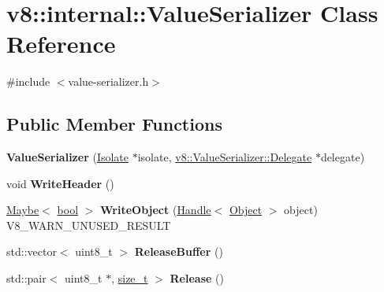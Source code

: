 \hypertarget{classv8_1_1internal_1_1ValueSerializer}{}\section{v8\+:\+:internal\+:\+:Value\+Serializer Class Reference}
\label{classv8_1_1internal_1_1ValueSerializer}


{\ttfamily \#include $<$value-\/serializer.\+h$>$}

\subsection*{Public Member Functions}
\begin{DoxyCompactItemize}
\item 
\mbox{\label{classv8_1_1internal_1_1ValueSerializer_a649f863d72c6bd8073cc7b3f9ec5e933}} 
{\bfseries Value\+Serializer} (\mbox{\hyperlink{classv8_1_1internal_1_1Isolate}{Isolate}} $\ast$isolate, \mbox{\hyperlink{classv8_1_1ValueSerializer_1_1Delegate}{v8\+::\+Value\+Serializer\+::\+Delegate}} $\ast$delegate)
\item 
\mbox{\label{classv8_1_1internal_1_1ValueSerializer_a614243f57ac8fadba4e98e546855e751}} 
void {\bfseries Write\+Header} ()
\item 
\mbox{\label{classv8_1_1internal_1_1ValueSerializer_ad038118e91c409ddb7e76c03247b33d9}} 
\mbox{\hyperlink{classv8_1_1Maybe}{Maybe}}$<$ \mbox{\hyperlink{classbool}{bool}} $>$ {\bfseries Write\+Object} (\mbox{\hyperlink{classv8_1_1internal_1_1Handle}{Handle}}$<$ \mbox{\hyperlink{classv8_1_1internal_1_1Object}{Object}} $>$ object) V8\+\_\+\+W\+A\+R\+N\+\_\+\+U\+N\+U\+S\+E\+D\+\_\+\+R\+E\+S\+U\+LT
\item 
\mbox{\label{classv8_1_1internal_1_1ValueSerializer_abb75d5a9771b5bd629efeca4db080171}} 
std\+::vector$<$ uint8\+\_\+t $>$ {\bfseries Release\+Buffer} ()
\item 
\mbox{\label{classv8_1_1internal_1_1ValueSerializer_afc8c547dd2a320c451006f983056af78}} 
std\+::pair$<$ uint8\+\_\+t $\ast$, \mbox{\hyperlink{classsize__t}{size\+\_\+t}} $>$ {\bfseries Release} ()

\end{DoxyCompactItemize}
